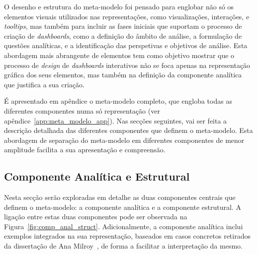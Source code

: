 O desenho e estrutura do meta-modelo foi pensado para englobar não só os elementos visuais utilizados nas representações, como visualizações, interações, e \textit{tooltips}, mas também para incluir as fases iniciais que suportam o processo de criação de \textit{dashboards}, como a definição do âmbito de análise, a formulação de questões analíticas, e a identificação das perspetivas e objetivos de análise. Esta abordagem mais abrangente de elementos tem como objetivo mostrar que o processo de \textit{design} de \textit{dashboards} interativos não se foca apenas na representação gráfica dos seus elementos, mas também na definição da componente analítica que justifica a sua criação.

É apresentado em apêndice o meta-modelo completo, que engloba todas as diferentes componentes numa só representação (ver apêndice~\ref{app:meta_modelo_app}). Nas secções seguintes, vai ser feita a descrição detalhada das diferentes componentes que definem o meta-modelo. Esta abordagem de separação do meta-modelo em diferentes componentes de menor amplitude facilita a sua apresentação e compreensão.

\subsection{Componente Analítica e Estrutural} %
\label{sub:anal_struct_comp}

Nesta secção serão exploradas em detalhe as duas componentes centrais que definem o meta-modelo: a componente analítica e a componente estrutural. A ligação entre estas duas componentes pode ser observada na Figura~\ref{fig:comp_anal_struct}. Adicionalmente, a componente analítica inclui exemplos integrados na sua representação, baseados em casos concretos retirados da dissertação de Ana Milroy~\cite{milroy2025}, de forma a facilitar a interpretação da mesmo.

